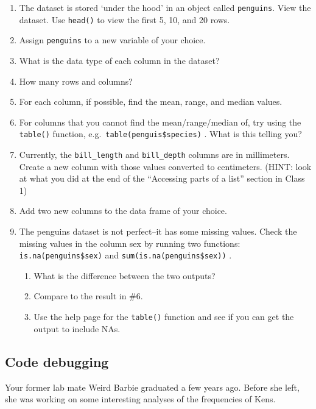 \documentclass[
  letterpaper,
  DIV=11,
  numbers=noendperiod]{scrreprt}
\providecommand{\tightlist}{%
  \setlength{\itemsep}{0pt}\setlength{\parskip}{0pt}}\usepackage{longtable,booktabs,array}
\begin{document}
\begin{enumerate}
\def\labelenumi{\arabic{enumi}.}
\tightlist
\item
  The dataset is stored `under the hood' in an object called
  \texttt{penguins}. View the dataset. Use \texttt{head()} to view the
  first 5, 10, and 20 rows.
\item
  Assign \texttt{penguins} to a new variable of your choice.
\item
  What is the data type of each column in the dataset?
\item
  How many rows and columns?
\item
  For each column, if possible, find the mean, range, and median values.
\item
  For columns that you cannot find the mean/range/median of, try using
  the \texttt{table()} function, e.g.~\texttt{table(penguis\$species)} .
  What is this telling you?
\item
  Currently, the \texttt{bill\_length} and \texttt{bill\_depth} columns
  are in millimeters. Create a new column with those values converted to
  centimeters. (HINT: look at what you did at the end of the ``Accessing
  parts of a list'' section in Class 1)
\item
  Add two new columns to the data frame of your choice.
\item
  The penguins dataset is not perfect--it has some missing values. Check
  the missing values in the column sex by running two functions:
  \texttt{is.na(penguins\$sex)} and \texttt{sum(is.na(penguins\$sex))} .

  \begin{enumerate}
  \def\labelenumii{\alph{enumii}.}
  \tightlist
  \item
    What is the difference between the two outputs?
  \item
    Compare to the result in \#6.
  \item
    Use the help page for the \texttt{table()} function and see if you
    can get the output to include NAs.
  \end{enumerate}
\end{enumerate}

\hypertarget{code-debugging}{%
\subsection{Code debugging}\label{code-debugging}}

Your former lab mate Weird Barbie graduated a few years ago. Before she
left, she was working on some interesting analyses of the frequencies of
Kens.
\end{document}
